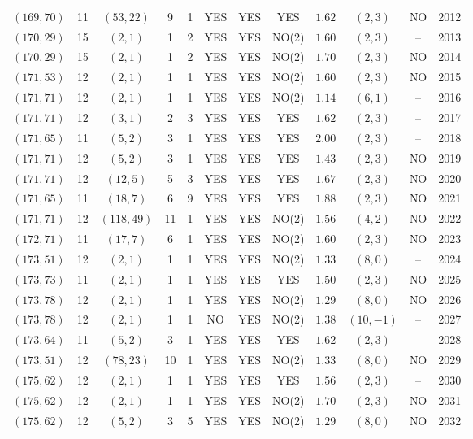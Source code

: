 \begin{longtable}{|c|c|c|c|c|c|c|c|c|c|c|c|}
$(169,70)$ & 11 & $(53,22)$ & 9 & 1 & YES & YES & YES & $1.62$ & $(2,3)$ & NO & 2012\\
$(170,29)$ & 15 & $(2,1)$ & 1 & 2 & YES & YES & NO(2) & $1.60$ & $(2,3)$ & -- & 2013\\
$(170,29)$ & 15 & $(2,1)$ & 1 & 2 & YES & YES & NO(2) & $1.70$ & $(2,3)$ & NO & 2014\\
$(171,53)$ & 12 & $(2,1)$ & 1 & 1 & YES & YES & NO(2) & $1.60$ & $(2,3)$ & NO & 2015\\
$(171,71)$ & 12 & $(2,1)$ & 1 & 1 & YES & YES & NO(2) & $1.14$ & $(6,1)$ & -- & 2016\\
$(171,71)$ & 12 & $(3,1)$ & 2 & 3 & YES & YES & YES & $1.62$ & $(2,3)$ & -- & 2017\\
$(171,65)$ & 11 & $(5,2)$ & 3 & 1 & YES & YES & YES & $2.00$ & $(2,3)$ & -- & 2018\\
$(171,71)$ & 12 & $(5,2)$ & 3 & 1 & YES & YES & YES & $1.43$ & $(2,3)$ & NO & 2019\\
$(171,71)$ & 12 & $(12,5)$ & 5 & 3 & YES & YES & YES & $1.67$ & $(2,3)$ & NO & 2020\\
$(171,65)$ & 11 & $(18,7)$ & 6 & 9 & YES & YES & YES & $1.88$ & $(2,3)$ & NO & 2021\\
$(171,71)$ & 12 & $(118,49)$ & 11 & 1 & YES & YES & NO(2) & $1.56$ & $(4,2)$ & NO & 2022\\
$(172,71)$ & 11 & $(17,7)$ & 6 & 1 & YES & YES & NO(2) & $1.60$ & $(2,3)$ & NO & 2023\\
$(173,51)$ & 12 & $(2,1)$ & 1 & 1 & YES & YES & NO(2) & $1.33$ & $(8,0)$ & -- & 2024\\
$(173,73)$ & 11 & $(2,1)$ & 1 & 1 & YES & YES & YES & $1.50$ & $(2,3)$ & NO & 2025\\
$(173,78)$ & 12 & $(2,1)$ & 1 & 1 & YES & YES & NO(2) & $1.29$ & $(8,0)$ & NO & 2026\\
$(173,78)$ & 12 & $(2,1)$ & 1 & 1 & NO & YES & NO(2) & $1.38$ & $(10,-1)$ & -- & 2027\\
$(173,64)$ & 11 & $(5,2)$ & 3 & 1 & YES & YES & YES & $1.62$ & $(2,3)$ & -- & 2028\\
$(173,51)$ & 12 & $(78,23)$ & 10 & 1 & YES & YES & NO(2) & $1.33$ & $(8,0)$ & NO & 2029\\
$(175,62)$ & 12 & $(2,1)$ & 1 & 1 & YES & YES & YES & $1.56$ & $(2,3)$ & -- & 2030\\
$(175,62)$ & 12 & $(2,1)$ & 1 & 1 & YES & YES & NO(2) & $1.70$ & $(2,3)$ & NO & 2031\\
$(175,62)$ & 12 & $(5,2)$ & 3 & 5 & YES & YES & NO(2) & $1.29$ & $(8,0)$ & NO & 2032\\

\end{longtable}
